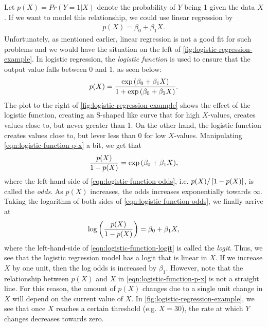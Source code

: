 Let $p(X) = Pr(Y = 1|X)$ denote the probability of $Y$ being 1 given the data $X$. If we want to model this relationship, we could use linear regression by
\begin{align}
    p(X) = \beta_0 + \beta_1 X.
\end{align}
Unfortunately, as mentioned earlier, linear regression is not a good fit for such problems and we would have the situation on the left of \cref{fig:logistic-regression-example}. In logistic regression, the \textit{logistic function} is used to ensure that the output value falls between 0 and 1, as seen below:
\begin{align}
    p(X) = \frac{\exp{\left(\beta_0 + \beta_1 X\right)}}{1 + \exp{\left(\beta_0 + \beta_1 X\right)}}.
    \label{eqn:logistic-function-p-x}
\end{align}
The plot to the right of \cref{fig:logistic-regression-example} shows the effect of the logistic function, creating an S-shaped like curve that for high $X$-values, creates values close to, but never greater than 1. On the other hand, the logistic function creates values close to, but lever less than 0 for low $X$-values. Manipulating \cref{eqn:logistic-function-p-x} a bit, we get that
\begin{align}
    \frac{p(X)}{1 - p(X)} = \exp{\left(\beta_0 + \beta_1 X\right)},
    \label{eqn:logistic-function-odds}
\end{align}
where the left-hand-side of \cref{eqn:logistic-function-odds}, i.e. $p(X)/\left[1 - p(X)\right]$, is called the \textit{odds}. As $p(X)$ increases, the odds increases exponentially towards $\infty$. Taking the logarithm of both sides of \cref{eqn:logistic-function-odds}, we finally arrive at
\begin{align}
    \log \left(\frac{p(X)}{1 - p(X)}\right) = \beta_0 + \beta_1 X,
    \label{eqn:logistic-function-logit}
\end{align}
where the left-hand-side of \cref{eqn:logistic-function-logit} is called the \textit{logit}. Thus, we see that the logistic regression model has a logit that is linear in $X$. If we increase $X$ by one unit, then the log odds is increased by $\beta_1$. However, note that the relationship between $p(X)$ and $X$ in \cref{eqn:logistic-function-p-x} is not a straight line. For this reason, the amount of $p(X)$ changes due to a single unit change in $X$ will depend on the current value of $X$. In \cref{fig:logistic-regression-example}, we see that once $X$ reaches a certain threshold (e.g. $X=30$), the rate at which $Y$ changes decreases towards zero.

